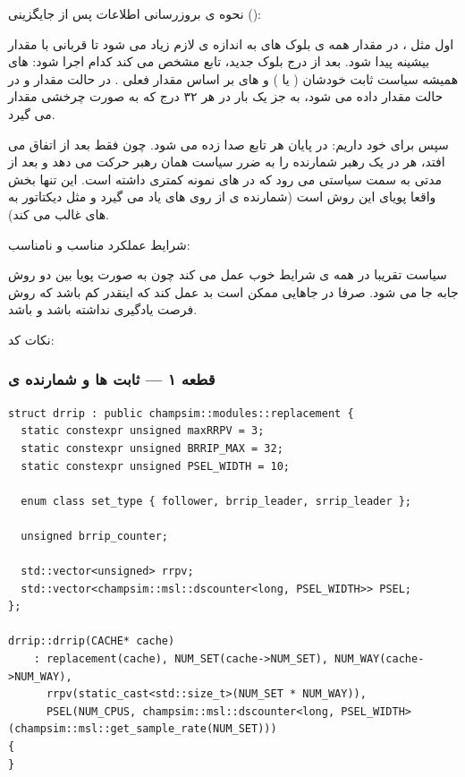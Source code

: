 \documentclass[12pt,a4paper]{article}
\begin{document}
نحوه ی بروزرسانی اطلاعات پس از جایگزینی ():

اول مثل ، در  مقدار  همه ی بلوک های  به اندازه ی لازم زیاد می شود تا قربانی با مقدار بیشینه پیدا شود. بعد از درج بلوک جدید، تابع  مشخص می کند کدام  اجرا شود:  های  همیشه سیاست ثابت خودشان ( یا ) و  های  بر اساس مقدار فعلی . در حالت  مقدار  و در حالت  مقدار  داده می شود، به جز یک بار در هر ۳۲ درج که به صورت چرخشی مقدار  می گیرد.

سپس برای خود  داریم: در پایان هر  تابع  صدا زده می شود. چون  فقط بعد از  اتفاق می افتد، هر  در یک  رهبر شمارنده را به ضرر سیاست همان رهبر حرکت می دهد و بعد از مدتی  به سمت سیاستی می رود که در  های نمونه  کمتری داشته است. این تنها بخش واقعا پویای این روش است (شمارنده ی  از روی  های  یاد می گیرد و مثل دیکتاتور به  های  غالب می کند).

شرایط عملکرد مناسب و نامناسب:

سیاست  تقریبا در همه ی شرایط خوب عمل می کند چون به صورت پویا بین دو روش جابه جا می شود. صرفا در جاهایی ممکن است بد عمل کند که  اینقدر کم باشد که روش فرصت یادگیری نداشته باشد و  باشد.

نکات کد:

\subsubsection{قطعه ۱ — ثابت ها و شمارنده ی }

\begin{latin}
\begin{lstlisting}
struct drrip : public champsim::modules::replacement {
  static constexpr unsigned maxRRPV = 3;
  static constexpr unsigned BRRIP_MAX = 32;
  static constexpr unsigned PSEL_WIDTH = 10;

  enum class set_type { follower, brrip_leader, srrip_leader };

  unsigned brrip_counter;

  std::vector<unsigned> rrpv;
  std::vector<champsim::msl::dscounter<long, PSEL_WIDTH>> PSEL;
};

drrip::drrip(CACHE* cache)
    : replacement(cache), NUM_SET(cache->NUM_SET), NUM_WAY(cache->NUM_WAY),
      rrpv(static_cast<std::size_t>(NUM_SET * NUM_WAY)),
      PSEL(NUM_CPUS, champsim::msl::dscounter<long, PSEL_WIDTH>(champsim::msl::get_sample_rate(NUM_SET)))
{
}
\end{lstlisting}
\end{latin}
\end{document}
